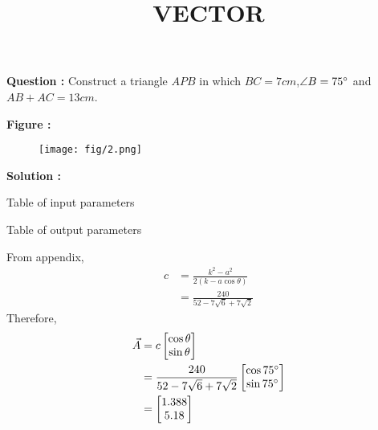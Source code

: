\documentclass[12pt]{article}
\providecommand{\brak}[1]{\ensuremath{\left(#1\right)}}
\begin{document}
\title{\textbf{VECTOR}}
\date{}
\maketitle
\textbf{Question :} Construct a triangle $APB$ in which $BC = 7cm$,$\angle B = 75\degree$ and $AB+AC = 13cm$.

\textbf{Figure :}
\begin{figure}[H]
    \centering
          \texttt{[image: fig/2.png]}
    \caption{}
    \label{fig:fig:1}
\end{figure}

\textbf{Solution :}
\begin{table}[H]
    \centering
    
    \caption{Table of input parameters}
    \label{tab:tab:1}
\end{table} 
\begin{table}[H]
    \centering
    
  \caption{Table of output parameters}
    \label{tab:tab:2}
\end{table}


From appendix,
\begin{align}
    c&=\frac{k^2-a^2}{2\brak{k-a\cos{\theta}}}\\
    &=\frac{240}{52-7\sqrt{6}+7\sqrt{2}}
    \end{align}
Therefore,
\begin{align}
    \Vec{A}&=c\begin{bmatrix}
        \cos{\theta}\\\sin{\theta}
    \end{bmatrix}\\
    &=\frac{240}{52-7\sqrt{6}+7\sqrt{2}}\begin{bmatrix}
        \cos{75\degree}\\\sin{75\degree}
    \end{bmatrix}\\
    &=\begin{bmatrix}
        1.388\\5.18
    \end{bmatrix}\\
\end{align}
\end{document}

